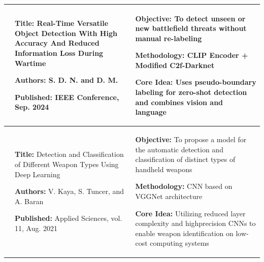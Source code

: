 \begin{center}
\begin{longtable}{
        |>{\centering\arraybackslash}m{1.22cm}
        |>{\raggedright\arraybackslash}m{6.3cm}
        |>{\raggedright\arraybackslash}m{6.3cm}|
        }
        9                                                                                            &
        \textbf{Title:} Real-Time Versatile Object Detection With High Accuracy And Reduced Information Loss During Wartime \par
        \textbf{Authors:} S. D. N. and D. M. \par
        \textbf{Published:} IEEE Conference, Sep. 2024                                               &
        \textbf{Objective:} To detect unseen or new battlefield threats without manual re-labeling \par
        \textbf{Methodology:} CLIP Encoder + Modified C2f-Darknet \par
        \textbf{Core Idea:} Uses pseudo-boundary labeling for zero-shot detection and combines vision and language                                                                         \\
        \hline

        10                                                                                           &
        \textbf{Title:} Detection and Classification of Different Weapon Types Using Deep Learning \par
        \textbf{Authors:} V. Kaya, S. Tuncer, and A. Baran \par
        \textbf{Published:} Applied Sciences, vol. 11, Aug. 2021                                     &
        \textbf{Objective:} To propose a model for the automatic detection and classification of distinct types of handheld weapons \par
        \textbf{Methodology:} CNN based on VGGNet architecture \par
        \textbf{Core Idea:} Utilizing reduced layer complexity and highprecision CNNs to enable weapon identification on low-cost computing systems                                        \\
        \hline


\end{longtable}
\end{center}
